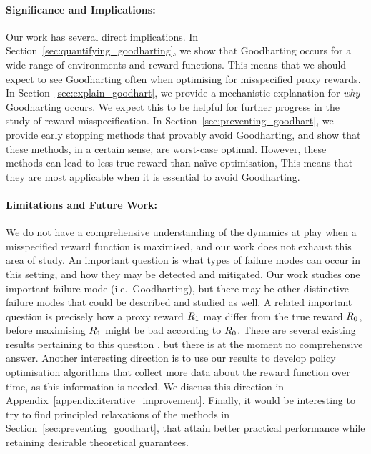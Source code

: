 \paragraph{Significance and Implications:} Our work has several direct implications.
In Section~\ref{sec:quantifying_goodharting}, we show that Goodharting occurs for a wide range of environments and reward functions. This means that we should expect to see Goodharting often when optimising for misspecified proxy rewards. 
In Section~\ref{sec:explain_goodhart}, we provide a mechanistic explanation for \emph{why} Goodharting occurs. We expect this to be helpful for further progress in the study of reward misspecification.
In Section~\ref{sec:preventing_goodhart}, we provide early stopping methods that provably avoid Goodharting, and show that these methods, in a certain sense, are worst-case optimal.
However, these methods can lead to less true reward than na\"ive optimisation,
This means that they are most applicable when it is essential to avoid Goodharting. 

\paragraph{Limitations and Future Work:}
We do not have a comprehensive understanding of the dynamics at play when a misspecified reward function is maximised, and our work does not exhaust this area of study.
An important question is what types of failure modes can occur in this setting, and how they may be detected and mitigated. Our work studies one important failure mode (i.e.\ Goodharting), but there may be other distinctive failure modes that could be described and studied as well. A related important question is precisely how a proxy reward $R_1$ may differ from the true reward $R_0$, before maximising $R_1$ might be bad according to $R_0$. There are several existing results pertaining to this question \citep{ng_policy_1999, gleave2021quantifying, skalse_defining_2022, skalse2022invariance}, but there is at the moment no comprehensive answer. Another interesting direction is to use our results to develop policy optimisation algorithms that collect more data about the reward function over time, as this information is needed. We discuss this direction in Appendix~\ref{appendix:iterative_improvement}. Finally, it would be interesting to try to find principled relaxations of the methods in Section~\ref{sec:preventing_goodhart}, that attain better practical performance while retaining desirable theoretical guarantees. 
